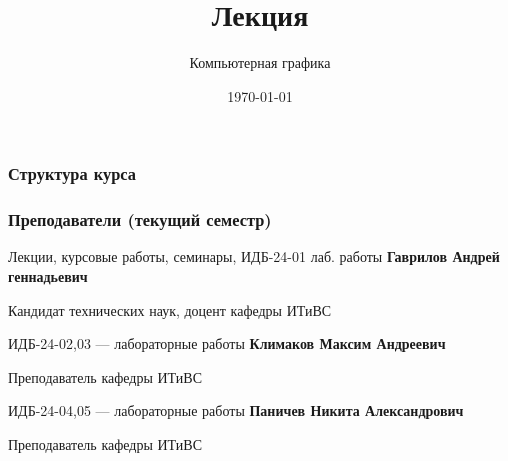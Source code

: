 \documentclass[10pt]{beamer}
\date{\today}
\title{Лекция \lecdni \\ \LectionTheme}
\subtitle{Компьютерная графика}
\begin{document}
	 
	 	
	
\QRFRAME
	
\frame{\maketitle}
	
\begin{frame}[t]
	\frametitle{Структура курса}
	
	
	
		
\end{frame}

\begin{frame}\frametitle{Преподаватели (текущий семестр)}
	
\begin{alertblock}{Лекции, курсовые работы, семинары, ИДБ-24-01 лаб. работы}
	\textbf{Гаврилов Андрей геннадьевич}	
	
	Кандидат технических наук, доцент кафедры ИТиВС
\end{alertblock}	

	
\begin{block}{ИДБ-24-02,03 --- лабораторные работы}
	\textbf{Климаков Максим Андреевич}	
	
	Преподаватель кафедры ИТиВС
\end{block}

\begin{block}{ИДБ-24-04,05 --- лабораторные работы}
	\textbf{Паничев Никита Александрович}	
	
	Преподаватель кафедры ИТиВС
\end{block}
	
	
\end{frame}
\end{document}
